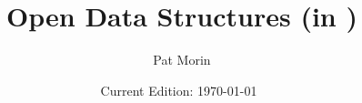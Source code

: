 \documentclass[11pt]{book}
\title{Open Data Structures (in \lang)}
\author{Pat Morin}
\date{Current Edition: \today\ \currenttime}
\begin{document}
\begin{titlepage}
  \maketitle
\end{titlepage}

\ \thispagestyle{empty}\newpage

\setcounter{page}{1}

\ \thispagestyle{empty}\newpage
\cpponly{
\ \thispagestyle{empty}\newpage
}


\tableofcontents















\javaonly{}



\end{document}
